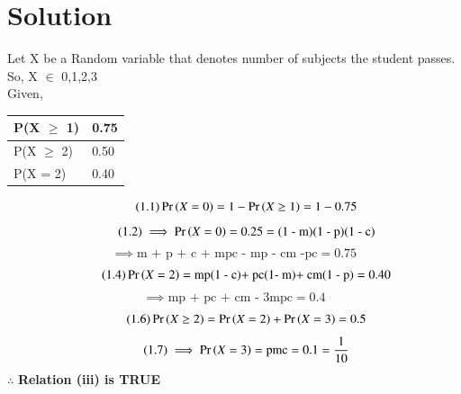 \documentclass[journal,12pt,twocolumn]{IEEEtran}
\begin{document}
\section{\textbf{Solution}}
Let X be a Random variable that denotes number of subjects the student passes. \\
So, X $\in$ {0,1,2,3} \\
Given,
\begin{table}[h]
\begin{tabular}{|l|l|}
\hline
P(X $\ge$ 1) & 0.75 \\ \hline
P(X $\ge$ 2) & 0.50 \\ \hline
P(X = 2)   & 0.40 \\ \hline
\end{tabular}
\end{table}
\begin{equation}
\tag{1.1}
\Pr\left(X = 0\right)  = 1 - \Pr\left(X \ge 1\right) = 1 - 0.75 \label{1} 
\end{equation}
\begin{equation}
    \tag{1.2}
\implies \Pr\left(X = 0\right) = 0.25= \text{(1 - m)(1 - p)(1 - c)}
\end{equation}
\begin{equation}
    \tag{1.3}
    \implies \text{m + p + c  + mpc - mp - cm -pc} = 0.75 \label{X = 0}
\end{equation}
\begin{equation}
    \tag{1.4}
\Pr\left(X = 2\right) = \text{mp(1 - c)+ pc(1- m)+ cm(1 - p)} = 0.40
\end{equation}
\begin{equation}
\tag{1.5}
    \implies \text{mp + pc + cm - 3mpc} = 0.4 \label{X = 2}
\end{equation}
\begin{equation}
    \tag{1.6}
    \Pr\left(X \ge 2\right) = \Pr\left(X = 2\right) + \Pr\left(X = 3\right) = 0.5 
\end{equation}
\begin{equation}
\tag{1.7}
    \implies \Pr\left(X = 3\right) = \text{pmc} = 0.1 = \frac{1}{10} \label{X = 3}
\end{equation}
\vspace{0.1cm}
$\therefore$ \textbf{Relation (iii) is TRUE}
\end{document}
